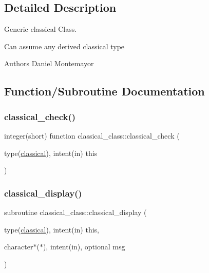 \subsection{Detailed Description}
Generic classical Class. 

Can assume any derived classical type \begin{DoxyAuthor}{Authors}
Daniel Montemayor 
\end{DoxyAuthor}


\subsection{Function/\+Subroutine Documentation}
\mbox{\label{namespaceclassical__class_ab91ea3d44c25f7d544b297e0b1a4f00a}} 
\subsubsection{\texorpdfstring{classical\+\_\+check()}{classical\_check()}}
{\footnotesize\ttfamily integer(short) function classical\+\_\+class\+::classical\+\_\+check (\begin{DoxyParamCaption}\item[{type(\hyperlink{structclassical__class_1_1classical}{classical}), intent(in)}]{this }\end{DoxyParamCaption})\hspace{0.3cm}{\ttfamily [private]}}

\mbox{\label{namespaceclassical__class_ac2d45f3adc9cbe9dcf22b9905ba1f649}} 
\subsubsection{\texorpdfstring{classical\+\_\+display()}{classical\_display()}}
{\footnotesize\ttfamily subroutine classical\+\_\+class\+::classical\+\_\+display (\begin{DoxyParamCaption}\item[{type(\hyperlink{structclassical__class_1_1classical}{classical}), intent(in)}]{this,  }\item[{character$\ast$($\ast$), intent(in), optional}]{msg }\end{DoxyParamCaption})\hspace{0.3cm}{\ttfamily [private]}}

